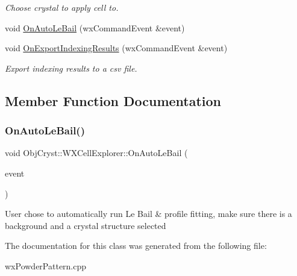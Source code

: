 \begin{DoxyCompactItemize}
\begin{DoxyCompactList}\small\item\em Choose crystal to apply cell to. \end{DoxyCompactList}\item 
void \mbox{\hyperlink{class_obj_cryst_1_1_w_x_cell_explorer_a91865d397ec704f8f7b49d6794701f6d}{On\+Auto\+Le\+Bail}} (wx\+Command\+Event \&event)
\item 
\mbox{\label{class_obj_cryst_1_1_w_x_cell_explorer_a51e3626f07276ec606078c81a8e7efda}} 
void \mbox{\hyperlink{class_obj_cryst_1_1_w_x_cell_explorer_a51e3626f07276ec606078c81a8e7efda}{On\+Export\+Indexing\+Results}} (wx\+Command\+Event \&event)
\begin{DoxyCompactList}\small\item\em Export indexing results to a csv file. \end{DoxyCompactList}\end{DoxyCompactItemize}


\subsection{Member Function Documentation}
\mbox{\label{class_obj_cryst_1_1_w_x_cell_explorer_a91865d397ec704f8f7b49d6794701f6d}} 
\subsubsection{\texorpdfstring{OnAutoLeBail()}{OnAutoLeBail()}}
{\footnotesize\ttfamily void Obj\+Cryst\+::\+W\+X\+Cell\+Explorer\+::\+On\+Auto\+Le\+Bail (\begin{DoxyParamCaption}\item[{wx\+Command\+Event \&}]{event }\end{DoxyParamCaption})}

User chose to automatically run Le Bail \& profile fitting, make sure there is a background and a crystal structure selected 

The documentation for this class was generated from the following file\+:\begin{DoxyCompactItemize}
\item 
wx\+Powder\+Pattern.\+cpp\end{DoxyCompactItemize}
